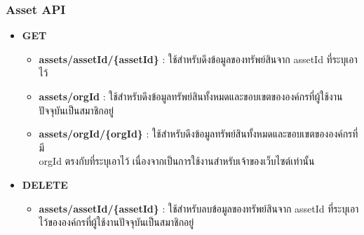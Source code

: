 \subsubsection{Asset API}

\ifenglish
\else
\begin{itemize}
    \item \textbf{GET}
    \begin{itemize}
        \item \textbf{assets/assetId/\{assetId\}} : ใช้สำหรับดึงข้อมูลของทรัพย์สินจาก assetId ที่ระบุเอาไว้
        \item \textbf{assets/orgId} : ใช้สำหรับดึงข้อมูลทรัพย์สินทั้งหมดและขอบเขตขององค์กรที่ผู้ใช้งานปัจจุบันเป็นสมาชิกอยู่
        \item \textbf{assets/orgId/\{orgId\}} : ใช้สำหรับดึงข้อมูลทรัพย์สินทั้งหมดและขอบเขตขององค์กรที่มี \\orgId ตรงกับที่ระบุเอาไว้ เนื่องจากเป็นการใช้งานสำหรับเจ้าของเว็บไซต์เท่านั้น
    \end{itemize}
    \item \textbf{DELETE}
    \begin{itemize}
        \item \textbf{assets/assetId/\{assetId\}} : ใช้สำหรับลบข้อมูลของทรัพย์สินจาก assetId ที่ระบุเอาไว้ขององค์กรที่ผู้ใช้งานปัจจุบันเป็นสมาชิกอยู่
    \end{itemize}
\end{itemize}
\fi